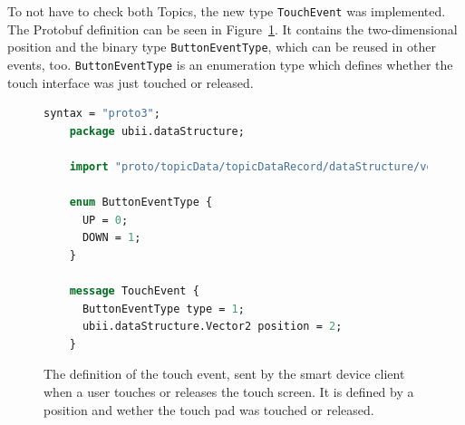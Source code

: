 To not have to check both Topics, the new type \lstinline{TouchEvent} was implemented. The \ac{Protobuf} definition can be seen in Figure~\ref{fig:ubii-event-type}. It contains the two-dimensional position and the binary type \mbox{\lstinline{ButtonEventType},} which can be reused in other events, too. \lstinline{ButtonEventType} is an enumeration type which defines whether the touch interface was just touched or released.

\begin{figure}[H]
	\begin{lstlisting}[language=Protobuf]
    syntax = "proto3";
    package ubii.dataStructure;
    
    import "proto/topicData/topicDataRecord/dataStructure/vector2.proto";
    
    enum ButtonEventType {
      UP = 0;
      DOWN = 1;
    }

    message TouchEvent {
      ButtonEventType type = 1;
      ubii.dataStructure.Vector2 position = 2;
    }
  \end{lstlisting}
	\caption[Protobuf definition of the touch event]{The definition of the touch event, sent by the smart device client when a user touches or releases the touch screen. It is defined by a position and wether the touch pad was touched or released.}\label{fig:ubii-event-type}
\end{figure}
